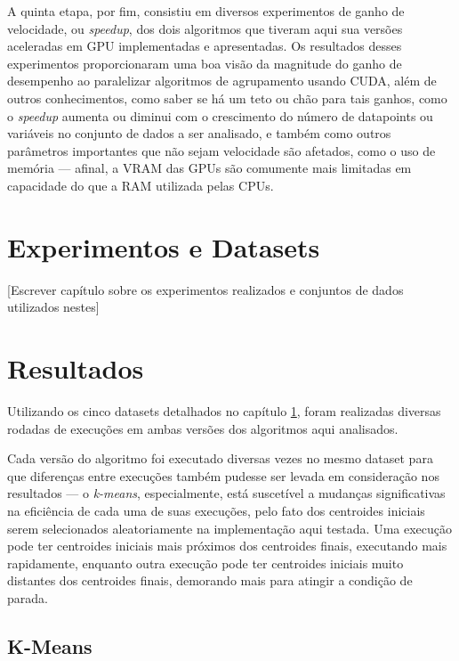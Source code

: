 \documentclass[12pt, %
openright, 
oneside, %
a4paper,    %
brazil]{facom-ufu-abntex2}
\def\qntAlgrtm{dois}
\begin{document}
A quinta etapa, por fim, consistiu em diversos experimentos de ganho de velocidade, ou \textit{speedup}, dos \qntAlgrtm{} algoritmos que tiveram aqui sua versões aceleradas em GPU implementadas e apresentadas. Os resultados desses experimentos proporcionaram uma boa visão da magnitude do ganho de desempenho ao paralelizar algoritmos de agrupamento usando CUDA, além de outros conhecimentos, como saber se há um teto ou chão para tais ganhos, como o \textit{speedup} aumenta ou diminui com o crescimento do número de datapoints ou variáveis no conjunto de dados a ser analisado, e também como outros parâmetros importantes que não sejam velocidade são afetados, como o uso de memória --- afinal, a VRAM das GPUs são comumente mais limitadas em capacidade do que a RAM utilizada pelas CPUs.





\chapter{Experimentos e Datasets}
\label{chp:exp}

[Escrever capítulo sobre os experimentos realizados e conjuntos de dados utilizados nestes]





\chapter{Resultados}

Utilizando os cinco datasets detalhados no capítulo \ref{chp:exp}, foram realizadas diversas rodadas de execuções em ambas versões dos algoritmos aqui analisados.

Cada versão do algoritmo foi executado diversas vezes no mesmo dataset para que diferenças entre execuções também pudesse ser levada em consideração nos resultados — o \textit{k-means}, especialmente, está suscetível a mudanças significativas na eficiência de cada uma de suas execuções, pelo fato dos centroides iniciais serem selecionados aleatoriamente na implementação aqui testada. Uma execução pode ter centroides iniciais mais próximos dos centroides finais, executando mais rapidamente, enquanto outra execução pode ter centroides iniciais muito distantes dos centroides finais, demorando mais para atingir a condição de parada.



\section{K-Means}
\end{document}
